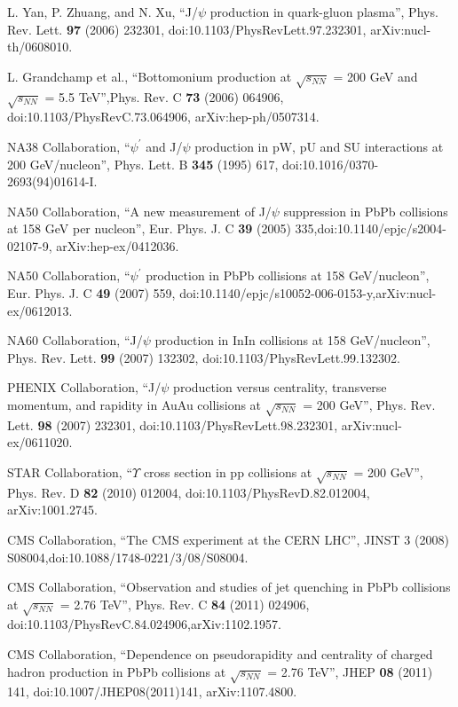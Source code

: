 \begin{thebibliography}{999}
 L. Yan, P. Zhuang, and N. Xu, ``J/$\psi$ production in quark-gluon plasma'', 
Phys. Rev. Lett. {\bf 97} (2006) 232301, doi:10.1103/PhysRevLett.97.232301, arXiv:nucl-th/0608010.


 L. Grandchamp et al., ``Bottomonium production at $\surd{s_{NN}}$ = 200 GeV 
and $\surd{s_{NN}}$ = 5.5 TeV'',Phys. Rev. C {\bf 73} (2006) 064906, doi:10.1103/PhysRevC.73.064906,
arXiv:hep-ph/0507314.


 NA38 Collaboration, ``$\psi^{'}$ and J/$\psi$ production in pW, pU and SU interactions at
200 GeV/nucleon'', Phys. Lett. B {\bf 345} (1995) 617, doi:10.1016/0370-2693(94)01614-I.

 NA50 Collaboration, ``A new measurement of J/$\psi$ suppression in PbPb collisions at
158 GeV per nucleon'', Eur. Phys. J. C {\bf 39} (2005) 335,doi:10.1140/epjc/s2004-02107-9, arXiv:hep-ex/0412036.

 NA50 Collaboration, ``$\psi^{'}$ production in PbPb collisions at 158 GeV/nucleon'', 
Eur. Phys. J. C {\bf 49} (2007) 559, doi:10.1140/epjc/s10052-006-0153-y,arXiv:nucl-ex/0612013.

NA60 Collaboration, ``J/$\psi$ production in InIn collisions at 158 GeV/nucleon'', 
Phys. Rev. Lett. {\bf 99} (2007) 132302, doi:10.1103/PhysRevLett.99.132302.

 PHENIX Collaboration, ``J/$\psi$ production versus centrality, transverse momentum, and
rapidity in AuAu collisions at $\surd{s_{NN}}$ = 200 GeV'', Phys. Rev. Lett. {\bf 98} (2007) 232301, doi:10.1103/PhysRevLett.98.232301, 
arXiv:nucl-ex/0611020.

 STAR Collaboration, ``$\Upsilon$ cross section in pp collisions at $\surd{s_{NN}}$ = 200 GeV'', Phys. Rev. D 
{\bf 82} (2010) 012004, doi:10.1103/PhysRevD.82.012004, arXiv:1001.2745.


 CMS Collaboration, ``The CMS experiment at the CERN LHC'', JINST 3 (2008) S08004,doi:10.1088/1748-0221/3/08/S08004.

 CMS Collaboration, ``Observation and studies of jet quenching in PbPb collisions at $\surd{s_{NN}}$ = 2.76 TeV'', 
Phys. Rev. C {\bf 84} (2011) 024906, doi:10.1103/PhysRevC.84.024906,arXiv:1102.1957.

 CMS Collaboration, ``Dependence on pseudorapidity and centrality of charged hadron production in PbPb collisions at 
$\surd{s_{NN}}$ = 2.76 TeV'', JHEP {\bf 08} (2011) 141, doi:10.1007/JHEP08(2011)141, arXiv:1107.4800.


\end{thebibliography}
